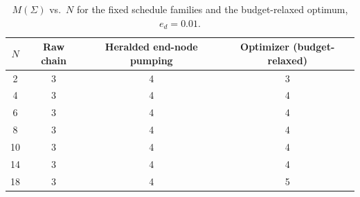 \begin{table}[ht]
    \centering
    \small
    \begin{tabular}{cccc}
        \hline
        $N$ & Raw chain & Heralded end-node pumping & Optimizer (budget-relaxed) \\
        \hline
        2  & 3 & 4 & 3 \\
        4  & 3 & 4 & 4 \\
        6  & 3 & 4 & 4 \\
        8  & 3 & 4 & 4 \\
        10 & 3 & 4 & 4 \\
        14 & 3 & 4 & 4 \\
        18 & 3 & 4 & 5 \\
        \hline
    \end{tabular}

    \caption[Concurrency requirement $M(\Sigma)$ vs.\ $N$]{$M(\Sigma)$ vs.\ $N$ for the fixed schedule families and the budget-relaxed optimum, $e_d=0.01$.}
    \label{tab:app:mmax}
\end{table}